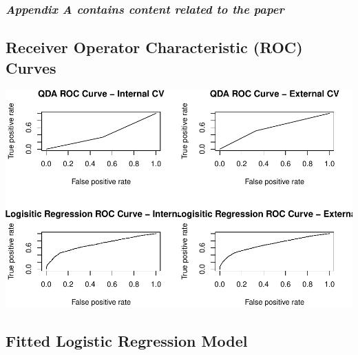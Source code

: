 \documentclass[american,]{article}
\begin{document}
\hypertarget{appendix-a-contains-content-related-to-the-paper}{%
\subsubsection{\texorpdfstring{\emph{Appendix A contains content related to the paper}}{Appendix A contains content related to the paper}}\label{appendix-a-contains-content-related-to-the-paper}}

\hypertarget{receiver-operator-characteristic-roc-curves}{%
\subsection{\texorpdfstring{\textbf{Receiver Operator Characteristic (ROC) Curves}}{Receiver Operator Characteristic (ROC) Curves}}\label{receiver-operator-characteristic-roc-curves}}

\begin{center}\includegraphics{Final_Project_Applied_files/figure-latex/ROC curves-1} \end{center}

\hypertarget{fitted-logistic-regression-model}{%
\subsection{\texorpdfstring{\textbf{Fitted Logistic Regression Model}}{Fitted Logistic Regression Model}}\label{fitted-logistic-regression-model}}

\begingroup\fontsize{10}{12}\selectfont
\end{document}
